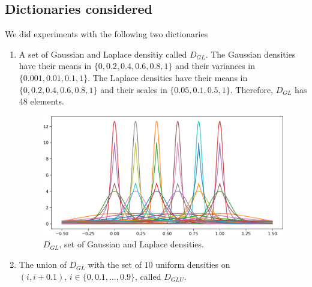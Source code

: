 \subsection{Dictionaries considered}
We did experiments with the following two dictionaries
\begin{enumerate}
\item A set of Gaussian and Laplace densitiy called $D_{GL}$. The Gaussian densities have their means in $\{0, 0.2, 0.4, 0.6, 0.8, 1\}$ and their variances in $\{0.001, 0.01, 0.1, 1\}$. The Laplace densities have their means in $\{0, 0.2, 0.4, 0.6, 0.8, 1\}$ and their scales in $\{0.05, 0.1, 0.5, 1\}$. Therefore, $D_{GL}$ has 48 elements.

\begin{figure}[h]
\centering
\includegraphics[width=1\textwidth]{TeX_files/lapl_gauss_dict.png}
\caption{$D_{GL}$, set of Gaussian and Laplace densities.}
\end{figure}
\item The union of $D_{GL}$ with the set of $10$ uniform densities on $(i, i+0.1),\, i\in \{0, 0.1,\dots,0.9\}$, called $D_{GLU}$.
\end{enumerate}

